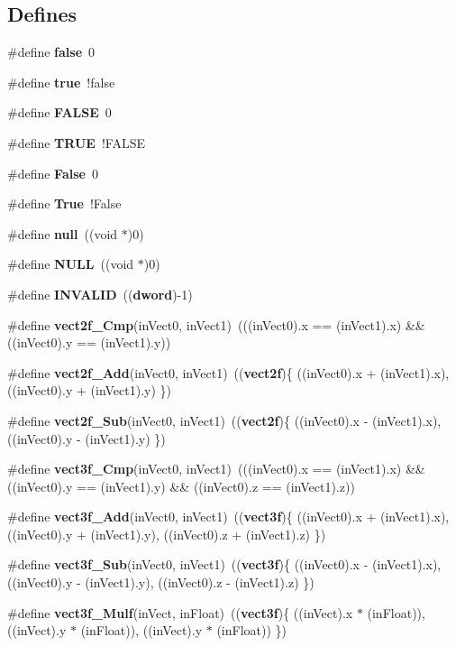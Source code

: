\subsection*{Defines}
\begin{CompactItemize}
\item 
\#define {\bf false}~0
\item 
\#define {\bf true}~!false
\item 
\#define {\bf FALSE}~0
\item 
\#define {\bf TRUE}~!FALSE
\item 
\#define {\bf False}~0
\item 
\#define {\bf True}~!False
\item 
\#define {\bf null}~((void $\ast$)0)
\item 
\#define {\bf NULL}~((void $\ast$)0)
\item 
\#define {\bf INVALID}~(({\bf dword})-1)
\item 
\#define {\bf vect2f\_\-Cmp}(in\-Vect0, in\-Vect1)~(((in\-Vect0).x == (in\-Vect1).x) \&\& ((in\-Vect0).y == (in\-Vect1).y))
\item 
\#define {\bf vect2f\_\-Add}(in\-Vect0, in\-Vect1)~(({\bf vect2f})\{ ((in\-Vect0).x + (in\-Vect1).x), ((in\-Vect0).y + (in\-Vect1).y) \})
\item 
\#define {\bf vect2f\_\-Sub}(in\-Vect0, in\-Vect1)~(({\bf vect2f})\{ ((in\-Vect0).x - (in\-Vect1).x), ((in\-Vect0).y - (in\-Vect1).y) \})
\item 
\#define {\bf vect3f\_\-Cmp}(in\-Vect0, in\-Vect1)~(((in\-Vect0).x == (in\-Vect1).x) \&\& ((in\-Vect0).y == (in\-Vect1).y) \&\& ((in\-Vect0).z == (in\-Vect1).z))
\item 
\#define {\bf vect3f\_\-Add}(in\-Vect0, in\-Vect1)~(({\bf vect3f})\{ ((in\-Vect0).x + (in\-Vect1).x), ((in\-Vect0).y + (in\-Vect1).y), ((in\-Vect0).z + (in\-Vect1).z) \})
\item 
\#define {\bf vect3f\_\-Sub}(in\-Vect0, in\-Vect1)~(({\bf vect3f})\{ ((in\-Vect0).x - (in\-Vect1).x), ((in\-Vect0).y - (in\-Vect1).y), ((in\-Vect0).z - (in\-Vect1).z) \})
\item 
\#define {\bf vect3f\_\-Mulf}(in\-Vect, in\-Float)~(({\bf vect3f})\{ ((in\-Vect).x $\ast$ (in\-Float)), ((in\-Vect).y $\ast$ (in\-Float)), ((in\-Vect).y $\ast$ (in\-Float)) \})
\end{CompactItemize}
